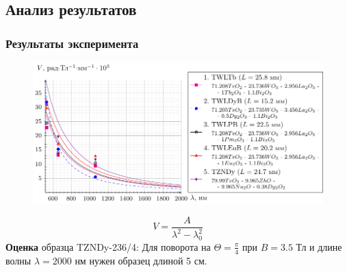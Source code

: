 \documentclass[10pt,pdf,hyperref={unicode}, dvipsnames]{beamer}
\begin{document}

\begin{frame}[t]
	\subsection{Анализ результатов}
	\frametitle{Результаты эксперимента}

	\vspace{-1em}
	\begin{figure}[tb]
		\centering
		\includegraphics[width=1\textwidth]{images/graph_verde_from_lambda2}
	\end{figure}
	\vspace{-1em}
	\begin{equation*}
		V=
		\frac{A}{\lambda^2-\lambda_0^2}
	\end{equation*}	
	\textbf{Оценка} образца TZNDy-236/4: Для поворота на $\Theta=\frac{\pi}{4}$ при $B=3.5$ Тл и длине волны $\lambda=2000$ нм нужен образец длиной 5 см.
	
	
	
\end{frame}

\end{document}
